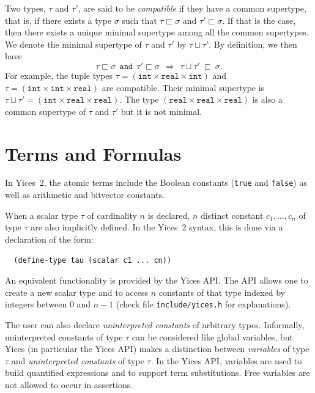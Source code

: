 \documentclass[11pt,twoside,fleqn,openright,titlepage]{cslreport}
\begin{document}
\medskip\noindent
Two types,  $\tau$ and $\tau'$, are  said to be  {\em compatible\/} if
they have a common supertype, that is, if there exists a type $\sigma$
such that  $\tau\sqsubset\sigma$ and $\tau'\sqsubset\sigma$.   If that
is the  case, then there exists  a unique minimal  supertype among all
the common supertypes.  We denote the minimal supertype  of $\tau$ and
$\tau'$ by $\tau\sqcup\tau'$. By definition, we then have
$$\tau\sqsubset\sigma~~\mathtt{and}~~\tau'\sqsubset\sigma~~\Rightarrow~~\tau\sqcup\tau'\:\sqsubset\:\sigma.$$
For            example,           the            tuple           types
$\tau=(\mathtt{int}\times\mathtt{real}\times\mathtt{int})$          and
$\tau=(\mathtt{int}\times\mathtt{int}\times\mathtt{real})$          are
compatible.   Their   minimal    supertype   is   $\tau\sqcup\tau'   =
(\mathtt{int}\times\mathtt{real}\times\mathtt{real})$.     The    type
$(\mathtt{real}\times\mathtt{real}\times\mathtt{real})$   is   also  a
common supertype of $\tau$ and $\tau'$ but it is not minimal.


\section{Terms and Formulas}
\label{terms-and-formulas}

In   Yices~2,  the   atomic  terms   include  the   Boolean  constants
(\texttt{true} and \texttt{false}) as well as arithmetic and bitvector
constants.

\medskip\noindent
When a scalar type $\tau$ of cardinality $n$ is declared, $n$ distinct
constant   $c_1,\ldots,c_n$  of  type   $\tau$  are   also  implicitly
defined. In the Yices~2 syntax, this  is done via a declaration of the
form:
\begin{small}
\begin{verbatim}
  (define-type tau (scalar c1 ... cn))
\end{verbatim}
\end{small}
An  equivalent functionality  is provided  by the  Yices API.  The API
allows one to create a new  scalar type and to access $n$ constants of
that  type indexed  by  integers  between $0$  and  $n-1$ (check  file
\texttt{include/yices.h} for explanations).

\medskip\noindent
The user can also declare {\em uninterpreted constants\/} of arbitrary
types.  Informally,  uninterpreted constants  of  type  $\tau$ can  be
considered like  global variables, but Yices (in  particular the Yices
API) makes a distinction between  {\em variables\/} of type $\tau$ and
{\em  uninterpreted constants\/}  of type  $\tau$. In  the  Yices API,
variables are used to build quantified expressions and to support term
substitutions. Free variables are not allowed to occur in assertions.
\end{document}
